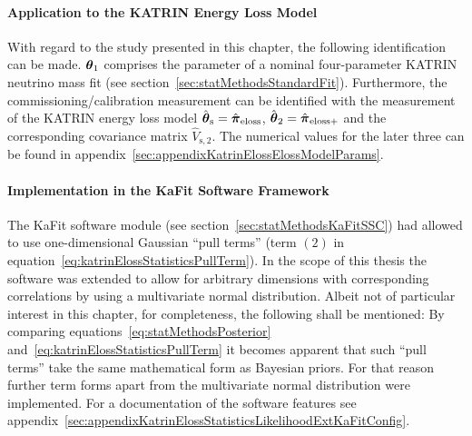 \paragraph{Application to the KATRIN Energy Loss Model}
With regard to the study presented in this chapter, the following identification can be made. $\boldsymbol{\mathbf{\theta}}_1$ comprises the parameter of a nominal four-parameter KATRIN neutrino mass fit (see section~\ref{sec:statMethodsStandardFit}). Furthermore, the commissioning/calibration measurement can be identified with the measurement of the KATRIN energy loss model $\hat{\boldsymbol{\mathbf{\theta}}}_\mathrm{s}=\hat{\boldsymbol{\mathbf{\pi}}}_\mathrm{eloss}$, $\hat{\boldsymbol{\mathbf{\theta}}}_2=\hat{\boldsymbol{\mathbf{\pi}}}_\mathrm{eloss+}$ and the corresponding covariance matrix $\hat{V}_\mathrm{s,2}$. The numerical values for the later three can be found in appendix~\ref{sec:appendixKatrinElossElossModelParams}.

\paragraph{Implementation in the KaFit Software Framework}
\label{sec:katrinElossStatisticsImplementation}
The KaFit software module (see section~\ref{sec:statMethodsKaFitSSC}) had allowed to use one-dimensional Gaussian ``pull terms'' (term $(2)$ in equation~\ref{eq:katrinElossStatisticsPullTerm}). In the scope of this thesis the software was extended to allow for arbitrary dimensions with corresponding correlations by using a multivariate normal distribution. Albeit not of particular interest in this chapter, for completeness, the following shall be mentioned: By comparing equations~\eqref{eq:statMethodsPosterior} and~\eqref{eq:katrinElossStatisticsPullTerm} it becomes apparent that such ``pull terms'' take the same mathematical form as Bayesian priors. For that reason further term forms apart from the multivariate normal distribution were implemented. For a documentation of the software features see appendix~\ref{sec:appendixKatrinElossStatisticsLikelihoodExtKaFitConfig}.


